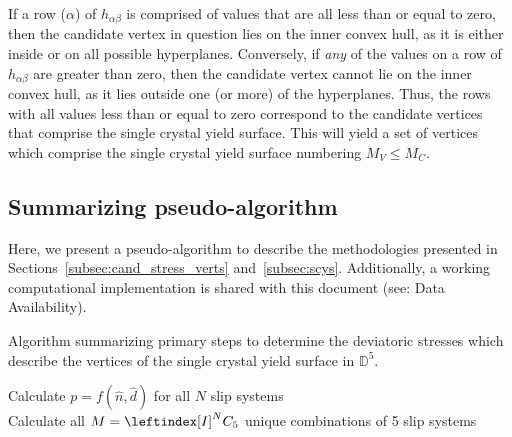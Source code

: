 \documentclass[preprint,3p,times,sort&compress,letterpaper,12pt]{elsarticle} %
\begin{document}
If a row ($\alpha$) of $h_{\alpha \beta}$ is comprised of values that are all less than or equal to zero, then the candidate vertex in question lies on the inner convex hull, as it is either inside or on all possible hyperplanes. Conversely, if \emph{any} of the values on a row of $h_{\alpha \beta}$ are greater than zero, then the candidate vertex cannot lie on the inner convex hull, as it lies outside one (or more) of the hyperplanes. Thus, the rows with all values less than or equal to zero correspond to the candidate vertices that comprise the single crystal yield surface. This will yield a set of vertices which comprise the single crystal yield surface numbering $M_V \leq M_C$.

\subsection{Summarizing pseudo-algorithm}
\label{subsec:pseudo-algo}

Here, we present a pseudo-algorithm to describe the methodologies presented in Sections~\ref{subsec:cand_stress_verts} and~\ref{subsec:scys}. Additionally, a working computational implementation is shared with this document (see: Data Availability).

\begin{algorithm}[H]
    \caption{Algorithm summarizing primary steps to determine the deviatoric stresses which describe the vertices of the single crystal yield surface in $\mathbb{D}^5$.}
    \label{alg:scys}
    Calculate $p = f\left(\hat{n},\hat{d}\right)$ for all $N$ slip systems \\
    Calculate all $M=\leftindex[I]^N {C}_5$ unique combinations of 5 slip systems \\
\end{algorithm}
\end{document}
